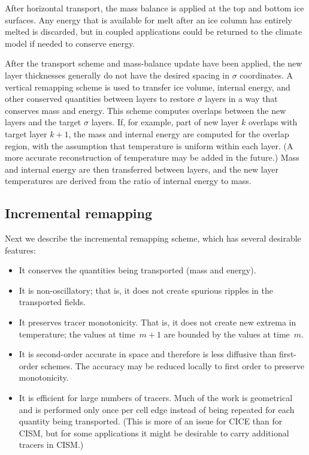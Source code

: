 After horizontal transport, the mass balance is applied at the top
and bottom ice surfaces.  Any energy that is available for melt after an ice
column has entirely melted is discarded, but in coupled applications
could be returned to the climate model if needed to conserve energy.

After the transport scheme and mass-balance update have been applied, 
the new layer thicknesses generally do not have the desired spacing in $\sigma$ coordinates.
A vertical remapping scheme is used to transfer ice volume, internal energy,
and other conserved quantities between layers to restore $\sigma$ layers in a way that conserves mass and energy. 
This scheme computes overlaps between the new layers and the target
$\sigma$ layers.  If, for example, part of new layer $k$ overlaps with target layer $k+1$,
the mass and internal energy are computed for the overlap region, with the assumption 
that temperature is uniform within each layer.
(A more accurate reconstruction of temperature may be added in the future.) 
Mass and internal energy are then transferred between layers, and the
new layer temperatures are derived from the ratio of internal energy to mass.

\subsection{Incremental remapping}
\label{sc:incremental_remapping}

Next we describe the incremental remapping scheme, which has several desirable features:
\begin{itemize}
\item It conserves the quantities being transported (mass and energy).
\item It is non-oscillatory; that is, it does not create spurious
      ripples in the transported fields.
\item It preserves tracer monotonicity.  That is, it does not create
      new extrema in temperature; the values
      at time~$m+1$ are bounded by the values at time~$m$.
\item It is second-order accurate in space and therefore is
      less diffusive than first-order schemes.
      The accuracy may be reduced locally to first order to preserve monotonicity.
\item It is efficient for large numbers of tracers.
      Much of the work is geometrical and is performed
      only once per cell edge instead of being repeated for each
      quantity being transported.  (This is more of an issue for CICE than
      for CISM, but for some applications it might be desirable to carry
      additional tracers in CISM.)
\end{itemize}

